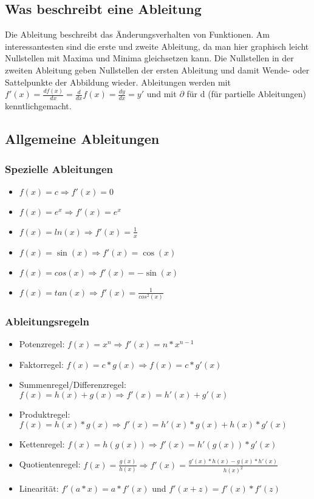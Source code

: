 \documentclass{scrreprt}
\begin{document}
\subsection{Was beschreibt eine Ableitung}\label{Was beschreibt eine Ableitung}
Die Ableitung beschreibt das Änderungsverhalten von Funktionen. Am interessantesten sind die erste und zweite Ableitung, da man hier 
graphisch leicht Nullstellen mit Maxima und Minima gleichsetzen kann. Die Nullstellen in der zweiten Ableitung geben Nullstellen der ersten Ableitung und damit Wende- oder Sattelpunkte der Abbildung wieder.
Ableitungen werden mit $f'(x) = \frac{d f(x)}{dx} = \frac{d}{dx}f(x) = \frac{dy}{dx} = y'$ und mit $\partial$ für d (für partielle Ableitungen) kenntlichgemacht. 
\subsection{Allgemeine Ableitungen}\label{Allgemeine Ableitungen}
\subsubsection{Spezielle Ableitungen}\label{Spezielle Ableitungen}
\begin{itemize}
    \item $f(x)=c \Rightarrow f'(x)=0$
    \item $f(x)=e^x \Rightarrow f'(x)=e^x$
    \item $f(x)=ln(x) \Rightarrow f'(x)=\frac{1}{x}$
    \item $f(x)=\sin(x) \Rightarrow f'(x)=\cos(x)$
    \item $f(x)=cos(x) \Rightarrow f'(x)=-\sin(x)$
    \item $f(x)=tan(x) \Rightarrow f'(x)=\frac{1}{cos^2(x)}$
\end{itemize}
\subsubsection{Ableitungsregeln}\label{Ableitungsregeln}
\begin{itemize}
    \item Potenzregel: $f(x)=x^n \Rightarrow f'(x)=n*x^{n-1}$
    \item Faktorregel: $f(x)=c*g(x) \Rightarrow f(x)=c*g'(x)$
    \item Summenregel/Differenzregel: $f(x)=h(x)+g(x) \Rightarrow f'(x)=h'(x)+g'(x)$
    \item Produktregel: $f(x)=h(x)*g(x) \Rightarrow f'(x)=h'(x)*g(x)+h(x)*g'(x)$
    \item Kettenregel: $f(x)=h(g(x)) \Rightarrow f'(x)=h'(g(x))*g'(x)$
    \item Quotientenregel: $f(x)=\frac{g(x)}{h(x)} \Rightarrow f'(x)=\frac{g'(x)*h(x)-g(x)*h'(x)}{h(x)^2} $
    \item Linearität: $f'(a*x)=a*f'(x)$ und $f'(x+z)=f'(x)*f'(z)$
\end{itemize}
\end{document}
